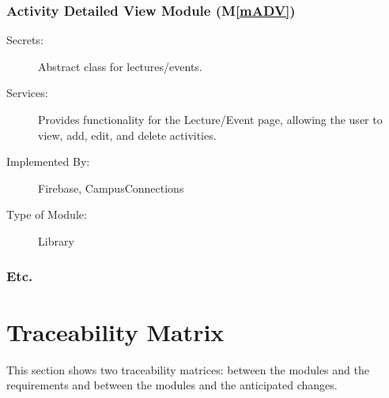 \documentclass[12pt, titlepage]{article}
\newcommand{\mref}[1]{M\ref{#1}}
\begin{document}
\subsubsection{Activity Detailed View Module (\mref{mADV})}
\begin{description}
  \item[Secrets:]Abstract class for lectures/events.
  \item[Services:]Provides functionality for the Lecture/Event page, allowing the user to view, add, edit, and delete activities.
  \item[Implemented By:] Firebase, CampusConnections
  \item[Type of Module:] Library
  \end{description}

\subsubsection{Etc.}

\section{Traceability Matrix} \label{SecTM}

This section shows two traceability matrices: between the modules and the
requirements and between the modules and the anticipated changes.
\end{document}
